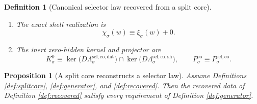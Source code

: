 \documentclass[11pt]{article}
\newcommand{\AmbientTarget}[1]{E_{#1}^{\mathrm{amb}}}
\newcommand{\GenEmbed}[1]{\chi_{#1}}
\newcommand{\Kernel}[1]{K_{#1}^{0}}
\newcommand{\StateComp}[1]{P_{#1}^{\mathrm{co}}}
\newcommand{\SelCoreData}[1]{\Lambda_{#1}^{\mathrm{sel,co,dat}}}
\newcommand{\SelCoreShell}[1]{\Lambda_{#1}^{\mathrm{sel,co,sh}}}
\newcommand{\SelCoreTime}[1]{\vartheta_{#1}^{\mathrm{sel,co}}}
\newcommand{\SelCoreEmbed}[1]{\xi_{#1}}
\newcommand{\SelCoreProj}[1]{P_{#1}^{\mathrm{sel,co}}}
\newtheorem{definition}{Definition}
\newtheorem{proposition}{Proposition}
\begin{document}
\begin{definition}[Canonical selector law recovered from a split core]
\begin{enumerate}
\[    \SelCoreTime{\sigma}\big|_{\AmbientTarget{\sigma}}
    \bigr).
    \]
    \item The exact shell realization is
    \begin{equation}
    \GenEmbed{\sigma}(w)\equiv \SelCoreEmbed{\sigma}(w)+0.
    \label{eq:recembed}
    \end{equation}
    \item The inert zero-hidden kernel and projector are
    \[
    \Kernel{\sigma}
    \equiv
    \ker\bigl(D\SelCoreData{\sigma}\bigr)
    \cap
    \ker\bigl(D\SelCoreShell{\sigma}\bigr),
    \qquad
    \StateComp{\sigma}\equiv \SelCoreProj{\sigma}.
    \]
\end{enumerate}
\end{definition}

\begin{proposition}[A split core reconstructs a selector law]
\label{prop:recovered}
Assume Definitions \ref{def:splitcore}, \ref{def:generator}, and \ref{def:recovered}. Then the recovered data of Definition \ref{def:recovered} satisfy every requirement of Definition \ref{def:generator}.
\end{proposition}
\end{document}
